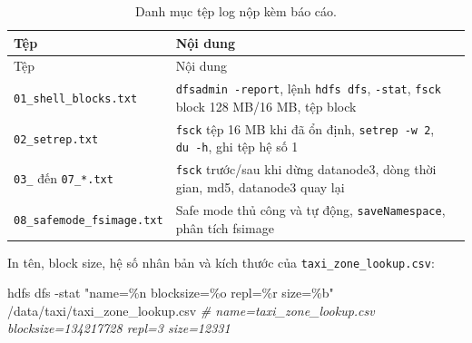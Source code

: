 \documentclass[
  12pt,
  a4paper,
]{report}
\newenvironment{Shaded}{}{}
\newcommand{\AttributeTok}[1]{\textcolor[rgb]{0.49,0.56,0.16}{#1}}
\newcommand{\CommentTok}[1]{\textcolor[rgb]{0.38,0.63,0.69}{\textit{#1}}}
\newcommand{\ExtensionTok}[1]{#1}
\newcommand{\NormalTok}[1]{#1}
\newcommand{\StringTok}[1]{\textcolor[rgb]{0.25,0.44,0.63}{#1}}
\begin{document}
\begin{longtable}[]{@{}
  >{\raggedright\arraybackslash}p{}
  >{\raggedright\arraybackslash}p{}@{}}
\caption{\label{tbl:l01-files}Danh mục tệp log nộp kèm báo
cáo.}\tabularnewline
\toprule\noalign{}
\begin{minipage}[b]{\linewidth}\raggedright
Tệp
\end{minipage} & \begin{minipage}[b]{\linewidth}\raggedright
Nội dung
\end{minipage} \\
\midrule\noalign{}
\endfirsthead
\toprule\noalign{}
\begin{minipage}[b]{\linewidth}\raggedright
Tệp
\end{minipage} & \begin{minipage}[b]{\linewidth}\raggedright
Nội dung
\end{minipage} \\
\midrule\noalign{}
\endhead
\bottomrule\noalign{}
\endlastfoot
\texttt{01\_}\allowbreak{}\texttt{shell\_}\allowbreak{}\texttt{blocks.}\allowbreak{}\texttt{txt}\allowbreak{}
& \texttt{dfsadmin\ -report}\allowbreak{}, lệnh \texttt{hdfs\ dfs},
\texttt{-stat}, \texttt{fsck} block 128 MB/16 MB, tệp block \\
\texttt{02\_setrep.txt} & \texttt{fsck} tệp 16 MB khi đã ổn định,
\texttt{setrep\ -w\ 2}, \texttt{du\ -h}, ghi tệp hệ số 1 \\
\texttt{03\_} đến \texttt{07\_*.txt} & \texttt{fsck} trước/sau khi dừng
datanode3, dòng thời gian, md5, datanode3 quay lại \\
\texttt{08\_}\allowbreak{}\texttt{safemode\_}\allowbreak{}\texttt{fsimage.}\allowbreak{}\texttt{txt}\allowbreak{}
& Safe mode thủ công và tự động, \texttt{saveNamespace}, phân tích
fsimage \\
\end{longtable}

In tên, block size, hệ số nhân bản và kích thước của
\texttt{taxi\_}\allowbreak{}\texttt{zone\_}\allowbreak{}\texttt{lookup.}\allowbreak{}\texttt{csv}\allowbreak{}:

\begin{Shaded}
\begin{Highlighting}[]
\ExtensionTok{hdfs}\NormalTok{ dfs }\AttributeTok{{-}stat} \StringTok{"name=\%n blocksize=\%o repl=\%r size=\%b"}\NormalTok{ /data/taxi/taxi\_zone\_lookup.csv}
\CommentTok{\# name=taxi\_zone\_lookup.csv blocksize=134217728 repl=3 size=12331}
\end{Highlighting}
\end{Shaded}
\end{document}
